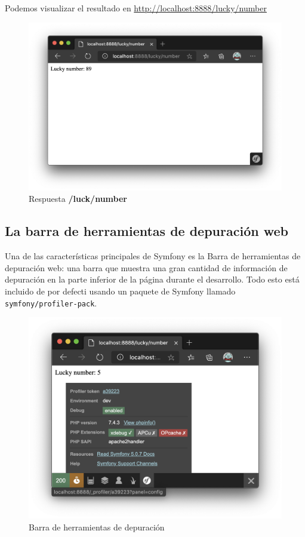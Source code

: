 Podemos visualizar el resultado en \href{http://localhost:8888/lucky/number}{http://localhost:8888/lucky/number}

\begin{figure}[ht]
  \centering
  \includegraphics[width=\textwidth]{../assets/lucky_number.png}
  \caption{Respuesta \textbf{/luck/number}}
  \label{fig:lucky_number}
\end{figure}
\clearpage
\subsection{La barra de herramientas de depuración web}
Una de las características principales de Symfony es la Barra de herramientas de depuración web: una barra que muestra una gran cantidad de información de depuración en la parte inferior de la página durante el desarrollo. Todo esto está incluido de por defecti usando un paquete de Symfony llamado \texttt{symfony/profiler-pack}.

\begin{figure}[ht]
  \centering
  \includegraphics[width=\textwidth]{../assets/symfony_debug_bar.png}
  \caption{Barra de herramientas de depuración}
  \label{fig:symfony_debug_bar}
\end{figure}
\clearpage
